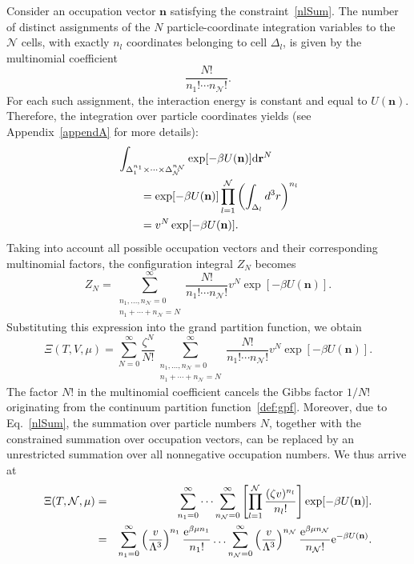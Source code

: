 \documentclass[12pt]{article}
\begin{document}
	Consider an occupation vector $\mathbf{n}$ satisfying the constraint~\eqref{nlSum}. The number of distinct assignments of the $N$ particle-coordinate integration variables to the $\mathcal{N}$ cells, with exactly $n_l$ coordinates belonging to cell $\Delta_l$, is given by the multinomial coefficient
	\begin{equation}
		\frac{N!}{n_1!\cdots n_{\mathcal{N}}!}.
	\end{equation}
	For each such assignment, the interaction energy is constant and equal to $U(\mathbf{n})$. Therefore, the integration over particle coordinates yields (see Appendix~\ref{appendA} for more details):
	\begin{equation}
			\begin{aligned}
			&\int_{\Delta_1^{n_1}\times\cdots\times
				\Delta_{\mathcal N}^{n_{\mathcal N}}}
			\exp[-\beta U(\mathbf n)] {\rm d} {\mathbf{r}}^N\\
			&\qquad =
			\exp[-\beta U(\mathbf n)]
			\prod_{l=1}^{\mathcal N}
			\left(\int_{\Delta_l}d^3r\right)^{n_l}\\
			&\qquad =
			v^N\exp[-\beta U(\mathbf n)].
		\end{aligned}
	\end{equation}
	Taking into account all possible occupation vectors and their corresponding multinomial factors, the configuration integral $Z_N$ becomes 
	\begin{equation}
		Z_N=
		\sum_{\substack{n_1,\ldots,n_{\mathcal N}=0\\
			n_1+\cdots+n_{\mathcal N}=N}}^{\infty}
		\frac{N!}{n_1!\cdots n_{\mathcal N}!}
		v^N\exp[-\beta U(\mathbf n)].
	\end{equation}
	Substituting this expression into the grand partition function, we obtain
	\begin{equation}
		\Xi(T, V, \mu) =
		\sum_{N=0}^{\infty}
		\frac{\zeta^N}{N!}
		\sum_{\substack{n_1,\ldots,n_{\mathcal N}=0\\
				n_1+\cdots+n_{\mathcal N}=N}}^{\infty}
		\frac{N!}{n_1!\cdots n_{\mathcal N}!}
		v^N\exp[-\beta U(\mathbf n)].
	\end{equation}
	The factor $N!$ in the multinomial coefficient cancels the Gibbs factor $1/N!$ originating from the continuum partition function~\eqref{def:gpf}. Moreover, due to Eq.~\eqref{nlSum}, the summation over particle numbers $N$, together with the constrained summation over occupation vectors, can be replaced by an unrestricted summation over all nonnegative occupation numbers. We thus arrive at
	\begin{eqnarray}
		\label{eq:Xi_lg}
		\Xi(T, \mathcal{N}, \mu) & = & 
		\sum_{n_1=0}^{\infty}\cdots
		\sum_{n_{\mathcal N}=0}^{\infty}
		\left[
			\prod_{l=1}^{\mathcal N}
			\frac{(\zeta v)^{n_l}}{n_l!}
		\right]
		\exp[-\beta U(\mathbf n)].
		\nonumber\\
		& = & \sum_{n_1 = 0}^\infty \left(\frac{v}{\Lambda^3}\right)^{n_1} \frac{{\rm e}^{\beta\mu n_1}}{n_1!} \ldots \sum_{n_{\mathcal{N}} = 0}^\infty \left(\frac{v}{\Lambda^3}\right)^{n_{\mathcal{N}}} \frac{{\rm e}^{\beta\mu n_{\mathcal{N}}}}{n_{\mathcal{N}}!} {\rm e}^{-\beta U(\mathbf{n})}.
	\end{eqnarray}
\end{document}

